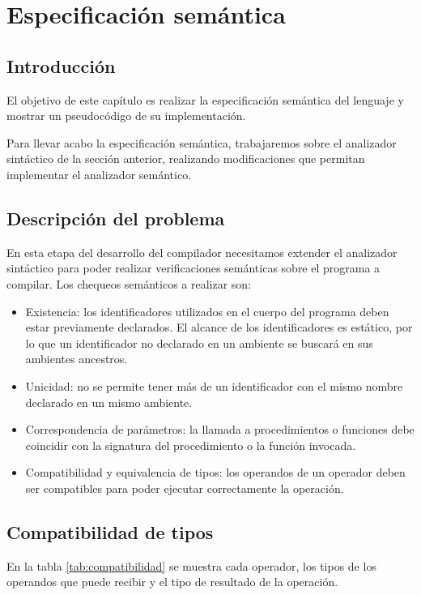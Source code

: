 \chapter{Especificación semántica}
\section{Introducción}
El objetivo de este capítulo es realizar la especificación semántica del lenguaje y mostrar un pseudocódigo de su implementación.

Para llevar acabo la especificación semántica, trabajaremos sobre el analizador sintáctico de la sección anterior, realizando modificaciones que permitan implementar el analizador semántico.%

\section{Descripción del problema}
\label{sec:sem:descr_probl}
En esta etapa del desarrollo del compilador necesitamos extender el analizador sintáctico para poder realizar verificaciones semánticas sobre el programa a compilar. Los chequeos semánticos a realizar son:
\begin{itemize}
\item Existencia: los identificadores utilizados en el cuerpo del programa deben estar previamente declarados. El alcance de los identificadores es estático, por lo que un identificador no declarado en un ambiente se buscará en sus ambientes ancestros.
\item Unicidad: no se permite tener más de un identificador con el mismo nombre declarado en un mismo ambiente.
\item Correspondencia de parámetros: la llamada a procedimientos o funciones debe coincidir con la signatura del procedimiento o la función invocada.
\item Compatibilidad y equivalencia de tipos: los operandos de un operador deben ser compatibles para poder ejecutar correctamente la operación. %
\end{itemize}

\section{Compatibilidad de tipos}
En la tabla \ref{tab:compatibilidad} se muestra cada operador, los tipos de los operandos que puede recibir y el tipo de resultado de la operación.


